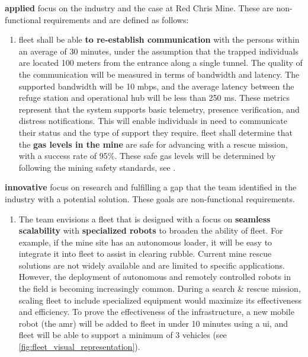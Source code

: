 \textbf{\gls{applied}} focus on the industry and the case at Red Chris Mine. These are non-functional requirements and are defined as follows:

\begin{enumerate}[resume]
    \item  \gls{fleet} shall be able \textbf{to re-establish communication} with the \gls{persons} within an average of 30 minutes, under the assumption that the trapped individuals are located 100 meters from the entrance along a single tunnel. The quality of the communication will be measured in terms of bandwidth and latency. The supported bandwidth will be 10 \gls{mbps}, and the average latency between the refuge station and operational hub will be less than 250 ms. These metrics represent that the system supports basic telemetry, presence verification, and distress notifications. This will enable individuals in need to communicate their status and the type of support they require. \gls{fleet} shall determine that the \textbf{gas levels in the mine} are safe for advancing with a rescue mission, with a success rate of 95\%. These safe gas levels will be determined by following the mining safety standards, see .
\end{enumerate}

\textbf{\gls{innovative}} focus on research and fulfilling a gap that the team identified in the industry with a potential solution. These goals are non-functional requirements.

\begin{enumerate}[resume]
    \item The team envisions a fleet that is designed with a focus on \textbf{seamless \gls{scalability}} with \textbf{specialized robots} to broaden the ability of \gls{fleet}. For example, if the mine site has an autonomous loader, it will be easy to integrate it into \gls{fleet} to assist in clearing rubble. Current mine rescue solutions are not widely available and are limited to specific applications. However, the deployment of autonomous and remotely controlled robots in the field is becoming increasingly common. During a search \& rescue mission, scaling \gls{fleet} to include specialized equipment would maximize its effectiveness and efficiency. To prove the effectiveness of the infrastructure, a new mobile robot (the \gls{amr}) will be added to \gls{fleet} in under 10 minutes using a \gls{ui}, and \gls{fleet} will be able to support a minimum of 3 vehicles (see \autoref{fig:fleet_visual_representation}).
\end{enumerate}
